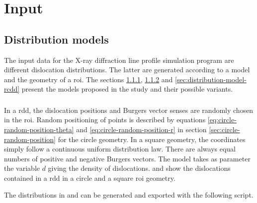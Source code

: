 \section{Input}

\subsection{Distribution models}

The input data for the X-ray diffraction line profile simulation program are different dislocation distributions.
The latter are generated according to a model and the geometry of a \gls{roi}.
The sections \ref{sec:distribution-model-rdd}, \ref{sec:distribution-model-rrdd} and \ref{sec:distribution-model-rcdd} present the models proposed in the study and their possible variants.

\subsubsection{}\label{sec:distribution-model-rdd}

In a \gls{rdd}, the dislocation positions and Burgers vector senses are randomly chosen in the \gls{roi}.
Random positioning of points is described by equations \eqref{eq:circle-random-position-theta} and \eqref{eq:circle-random-position-r} in section \ref{sec:circle-random-position} for the circle geometry.
In a square geometry, the coordinates simply follow a continuous uniform distribution law.
There are always equal numbers of positive and negative Burgers vectors.
The model takes as parameter the variable \( d \) giving the density of dislocations.
 and  show the dislocations contained in a \gls{rdd} in a circle and a square \gls{roi} geometry.

%
%

\bigskip \bigskip

The distributions in  and  can be generated and exported with the following script.

\medskip


\newpage

\subsubsection{}\label{sec:distribution-model-rrdd}

